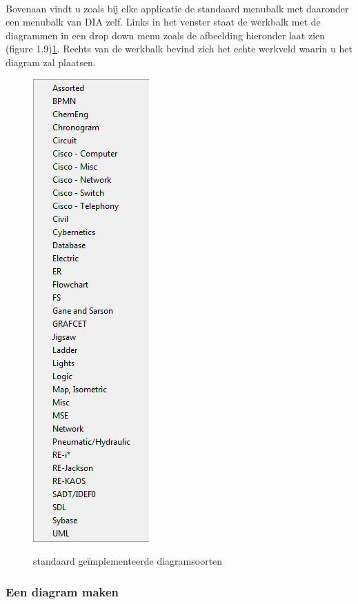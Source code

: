 \documentclass[12pt,a4paper]{report}
\begin{document}
\begin{flushleft}
\paragraph*{}
Bovenaan vindt u zoals bij elke applicatie de standaard menubalk met daaronder een menubalk van DIA zelf. Links in het venster staat de werkbalk met de diagrammen in een drop down menu zoals de afbeelding hieronder laat zien (figure 1.9)\ref{werkveld_02}. Rechts van de werkbalk bevind zich het echte werkveld waarin u het diagram zal plaatsen.
\begin{figure}[H]
\includegraphics[scale=0.5]{images/werkveld_02.png}
\label{werkveld_02}
\centering 
\vspace{-10pt}
\caption{standaard geïmplementeerde diagramsoorten}
\end{figure}
\subsubsection{Een diagram maken}

\end{flushleft}
\end{document}
